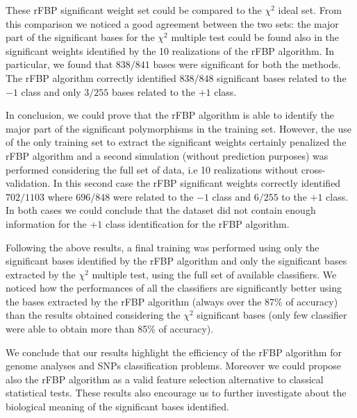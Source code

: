 \documentclass{standalone}
\begin{document}
These rFBP significant weight set could be compared to the $\chi^2$ ideal set.
From this comparison we noticed a good agreement between the two sets: the major part of the significant bases for the $\chi^2$ multiple test could be found also in the significant weights identified by the 10 realizations of the rFBP algorithm.
In particular, we found that $838/841$ bases were significant for both the methods.
The rFBP algorithm correctly identified $838/848$ significant bases related to the $-1$ class and only $3/255$ bases related to the $+1$ class.

In conclusion, we could prove that the rFBP algorithm is able to identify the major part of the significant polymorphisms in the training set.
However, the use of the only training set to extract the significant weights certainly penalized the rFBP algorithm and a second simulation (without prediction purposes) was performed considering the full set of data, i.e 10 realizations without cross-validation.
In this second case the rFBP significant weights correctly identified $702/1103$ where $696/848$ were related to the $-1$ class and $6/255$ to the $+1$ class.
In both cases we could conclude that the dataset did not contain enough information for the $+1$ class identification for the rFBP algorithm.

Following the above results, a final training was performed using only the significant bases identified by the rFBP algorithm and only the significant bases extracted by the $\chi^2$ multiple test, using the full set of available classifiers.
We noticed how the performances of all the classifiers are significantly better using the bases extracted by the rFBP algorithm (always over the 87\% of accuracy) than the results obtained considering the $\chi^2$ significant bases (only few classifier were able to obtain more than 85\% of accuracy).

We conclude that our results highlight the efficiency of the rFBP algorithm for genome analyses and SNPs classification problems.
Moreover we could propose also the rFBP algorithm as a valid feature selection alternative to classical statistical tests.
These results also encourage us to further investigate about the biological meaning of the significant bases identified.
\end{document}
